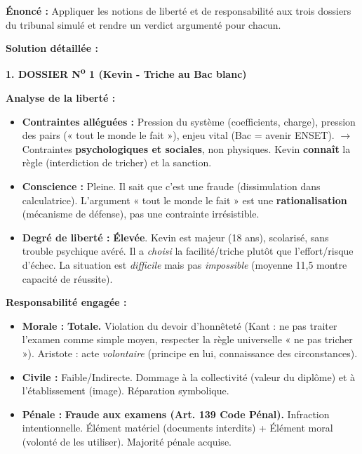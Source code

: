 \documentclass[11pt]{article}
\begin{document}
\begin{exoresolu}
\textbf{Énoncé :} Appliquer les notions de liberté et de responsabilité aux trois dossiers du tribunal simulé et rendre un verdict argumenté pour chacun.

\tcblower
\textbf{Solution détaillée :}

\noindent\textbf{1. DOSSIER N\textsuperscript{o} 1 (Kevin - Triche au Bac blanc)}

\medskip
\noindent\textbf{Analyse de la liberté :}
\begin{itemize}
    \item \textbf{Contraintes alléguées :} Pression du système (coefficients, charge), pression des pairs (« tout le monde le fait »), enjeu vital (Bac = avenir ENSET). $\rightarrow$ Contraintes \textbf{psychologiques et sociales}, non physiques. Kevin \textbf{connaît} la règle (interdiction de tricher) et la sanction.
    \item \textbf{Conscience :} Pleine. Il sait que c'est une fraude (dissimulation dans calculatrice). L'argument « tout le monde le fait » est une \textbf{rationalisation} (mécanisme de défense), pas une contrainte irrésistible.
    \item \textbf{Degré de liberté :} \textbf{Élevée}. Kevin est majeur (18 ans), scolarisé, sans trouble psychique avéré. Il a \textit{choisi} la facilité/triche plutôt que l'effort/risque d'échec. La situation est \textit{difficile} mais pas \textit{impossible} (moyenne 11,5 montre capacité de réussite).
\end{itemize}

\medskip
\noindent\textbf{Responsabilité engagée :}
\begin{itemize}
    \item \textbf{Morale :} \textbf{Totale.} Violation du devoir d'honnêteté (Kant : ne pas traiter l'examen comme simple moyen, respecter la règle universelle « ne pas tricher »). Aristote : acte \textit{volontaire} (principe en lui, connaissance des circonstances).
    \item \textbf{Civile :} Faible/Indirecte. Dommage à la collectivité (valeur du diplôme) et à l'établissement (image). Réparation symbolique.
    \item \textbf{Pénale :} \textbf{Fraude aux examens (Art. 139 Code Pénal).} Infraction intentionnelle. Élément matériel (documents interdits) + Élément moral (volonté de les utiliser). Majorité pénale acquise.
\end{itemize}


\end{exoresolu}
\end{document}
